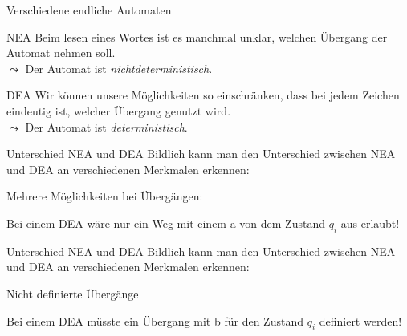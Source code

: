 \begin{frame}[fragile]{Verschiedene endliche Automaten}
    \begin{alertblock}{NEA}
    Beim lesen eines Wortes ist es manchmal unklar, welchen Übergang der Automat nehmen soll.\\
    $\leadsto$ Der Automat ist \emph{\alert{nichtdeterministisch}}.
    \end{alertblock}
    \begin{alertblock}{DEA}
    Wir können unsere Möglichkeiten so einschränken, dass bei jedem Zeichen eindeutig ist, welcher Übergang genutzt wird.\\
    $\leadsto$ Der Automat ist \alert{\emph{deterministisch}}.
    \end{alertblock}
\end{frame}

\begin{frame}[fragile]{Unterschied NEA und DEA}
    Bildlich kann man den Unterschied zwischen NEA und DEA an verschiedenen Merkmalen erkennen:
    \begin{alertblock}{Mehrere Möglichkeiten bei Übergängen:}
        \begin{center}
        \end{center}
    Bei einem DEA wäre nur ein Weg mit einem \alert{a} von dem Zustand $q_i$ aus erlaubt!
    \end{alertblock}
\end{frame}

\begin{frame}[fragile]{Unterschied NEA und DEA}
    Bildlich kann man den Unterschied zwischen NEA und DEA an verschiedenen Merkmalen erkennen:
    \begin{alertblock}{Nicht definierte Übergänge}
        \begin{center}
        \end{center}
    Bei einem DEA müsste ein Übergang mit \alert{b} für den Zustand $q_i$ definiert werden!
    \end{alertblock}
\end{frame}

